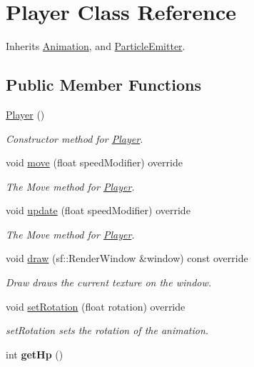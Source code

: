 \hypertarget{class_player}{\section{Player Class Reference}
\label{class_player}
}


Inherits \hyperlink{class_animation}{Animation}, and \hyperlink{class_particle_emitter}{Particle\+Emitter}.

\subsection*{Public Member Functions}
\begin{DoxyCompactItemize}
\item 
\hyperlink{class_player_affe0cc3cb714f6deb4e62f0c0d3f1fd8}{Player} ()
\begin{DoxyCompactList}\small\item\em Constructor method for \hyperlink{class_player}{Player}. \end{DoxyCompactList}\item 
void \hyperlink{class_player_a79a7509b3cde94c77b79247fa46b13dd}{move} (float speed\+Modifier) override
\begin{DoxyCompactList}\small\item\em The Move method for \hyperlink{class_player}{Player}. \end{DoxyCompactList}\item 
void \hyperlink{class_player_a70e7b6ef62c5b8080e454edcb15cacc8}{update} (float speed\+Modifier) override
\begin{DoxyCompactList}\small\item\em The Move method for \hyperlink{class_player}{Player}. \end{DoxyCompactList}\item 
void \hyperlink{class_player_a5e0147aee1248db63417987b9a203a9a}{draw} (sf\+::\+Render\+Window \&window) const override
\begin{DoxyCompactList}\small\item\em Draw draws the current texture on the window. \end{DoxyCompactList}\item 
void \hyperlink{class_player_af81c4b00747424065dae4984f4f6c57e}{set\+Rotation} (float rotation) override
\begin{DoxyCompactList}\small\item\em set\+Rotation sets the rotation of the animation. \end{DoxyCompactList}\item 
\hypertarget{class_player_aa6479f194f9bb44b09adaf3b04a5594d}{int {\bfseries get\+Hp} ()}\label{class_player_aa6479f194f9bb44b09adaf3b04a5594d}


\end{DoxyCompactItemize}
